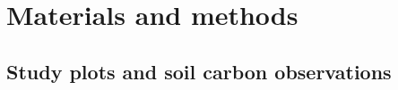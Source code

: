 \documentclass[11pt]{article}
\begin{document}
%
%
%
%

\section{Materials and methods}


\subsection{Study plots and soil carbon observations}
\end{document}
